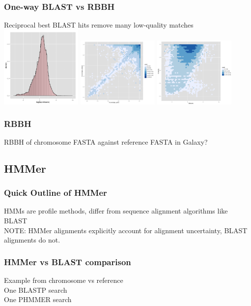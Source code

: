 \documentclass[table]{beamer}
\begin{document}
    \begin{frame}
      \frametitle{One-way BLAST vs RBBH}   
      Reciprocal best BLAST hits remove many low-quality matches
        \includegraphics[width=0.3\textwidth]{images/rbbh4}  
        \includegraphics[width=0.3\textwidth]{images/rbbh5}  
        \includegraphics[width=0.3\textwidth]{images/rbbh6}                        
    \end{frame}

    \begin{frame}
      \frametitle{RBBH}   
      RBBH of chromosome FASTA against reference FASTA in Galaxy?       
    \end{frame}

   \subsection{HMMer}
    \begin{frame}
      \frametitle{Quick Outline of HMMer}   
      HMMs are profile methods, differ from sequence alignment algorithms like BLAST \\
      NOTE: HMMer alignments explicitly account for alignment uncertainty, BLAST alignments do not.
    \end{frame}

    \begin{frame}
      \frametitle{HMMer vs BLAST comparison}   
      Example from chromosome vs reference \\
      One BLASTP search \\
      One PHMMER search
    \end{frame}
\end{document}
